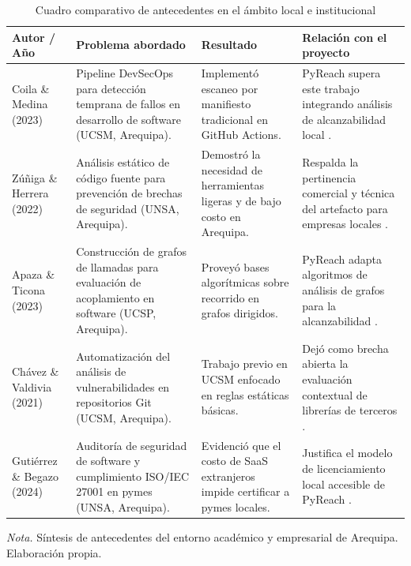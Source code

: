 \begin{table}[H]
\centering
\caption{Cuadro comparativo de antecedentes en el ámbito local e institucional}
\label{tab:antecedentes_locales}
\small
{}
\begin{tabularx}{\textwidth}{>{\raggedright\arraybackslash}p{3.2cm} >{\raggedright\arraybackslash}p{3.8cm} >{\raggedright\arraybackslash}p{3.6cm} X}
\toprule
\textbf{Autor / Año} & \textbf{Problema abordado} & \textbf{Resultado} & \textbf{Relación con el proyecto} \\
\midrule
Coila \& Medina (2023) & 
Pipeline DevSecOps para detección temprana de fallos en desarrollo de software (UCSM, Arequipa). & 
Implementó escaneo por manifiesto tradicional en GitHub Actions. & 
PyReach supera este trabajo integrando análisis de alcanzabilidad local \parencite{coila2023devsecops}. \\ %
\addlinespace
Zúñiga \& Herrera (2022) & 
Análisis estático de código fuente para prevención de brechas de seguridad (UNSA, Arequipa). & 
Demostró la necesidad de herramientas ligeras y de bajo costo en Arequipa. & 
Respalda la pertinencia comercial y técnica del artefacto para empresas locales \parencite{zuniga2022analisis}. \\ %
\addlinespace
Apaza \& Ticona (2023) & 
Construcción de grafos de llamadas para evaluación de acoplamiento en software (UCSP, Arequipa). & 
Proveyó bases algorítmicas sobre recorrido en grafos dirigidos. & 
PyReach adapta algoritmos de análisis de grafos para la alcanzabilidad \parencite{apaza2023grafos}. \\ %
\addlinespace
Chávez \& Valdivia (2021) & 
Automatización del análisis de vulnerabilidades en repositorios Git (UCSM, Arequipa). & 
Trabajo previo en UCSM enfocado en reglas estáticas básicas. & 
Dejó como brecha abierta la evaluación contextual de librerías de terceros \parencite{chavez2021automatizacion}. \\ %
\addlinespace
Gutiérrez \& Begazo (2024) & 
Auditoría de seguridad de software y cumplimiento ISO/IEC 27001 en pymes (UNSA, Arequipa). & 
Evidenció que el costo de SaaS extranjeros impide certificar a pymes locales. & 
Justifica el modelo de licenciamiento local accesible de PyReach \parencite{gutierrez2024auditoria}. \\ %
\bottomrule
\end{tabularx}
\vspace{2pt}
\begin{flushleft}
\scriptsize \textit{Nota.} Síntesis de antecedentes del entorno académico y empresarial de Arequipa. Elaboración propia.
\end{flushleft}
\end{table}

